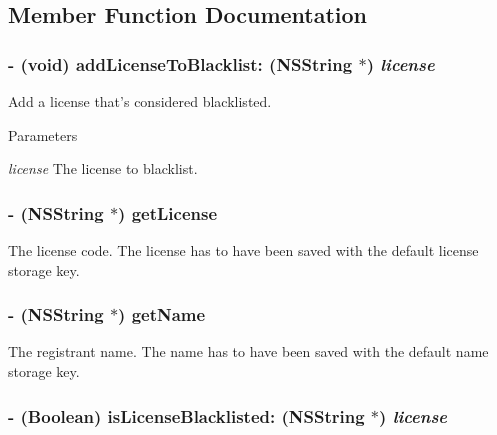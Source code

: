 \subsection{Member Function Documentation}
\hypertarget{interface_g_d_registration_a7b212d406ecc9f8dc9dc19714baac7f8}{
\subsubsection[{addLicenseToBlacklist:}]{\setlength{\rightskip}{0pt plus 5cm}-\/ (void) addLicenseToBlacklist: (NSString $\ast$) {\em license}}}
\label{interface_g_d_registration_a7b212d406ecc9f8dc9dc19714baac7f8}


Add a license that's considered blacklisted. 
\begin{DoxyParams}{Parameters}
\item[{\em license}]The license to blacklist. \end{DoxyParams}
\hypertarget{interface_g_d_registration_ad8830b56a002a550f28c095233078aba}{
\subsubsection[{getLicense}]{\setlength{\rightskip}{0pt plus 5cm}-\/ (NSString $\ast$) getLicense }}
\label{interface_g_d_registration_ad8830b56a002a550f28c095233078aba}


The license code. The license has to have been saved with the default license storage key. \hypertarget{interface_g_d_registration_a748a7113b6adcf0337c820aa56bb01ed}{
\subsubsection[{getName}]{\setlength{\rightskip}{0pt plus 5cm}-\/ (NSString $\ast$) getName }}
\label{interface_g_d_registration_a748a7113b6adcf0337c820aa56bb01ed}


The registrant name. The name has to have been saved with the default name storage key. \hypertarget{interface_g_d_registration_a4b3b036fb9260a31cc1eca5bb436d27e}{
\subsubsection[{isLicenseBlacklisted:}]{\setlength{\rightskip}{0pt plus 5cm}-\/ (Boolean) isLicenseBlacklisted: (NSString $\ast$) {\em license}}}
\label{interface_g_d_registration_a4b3b036fb9260a31cc1eca5bb436d27e}


